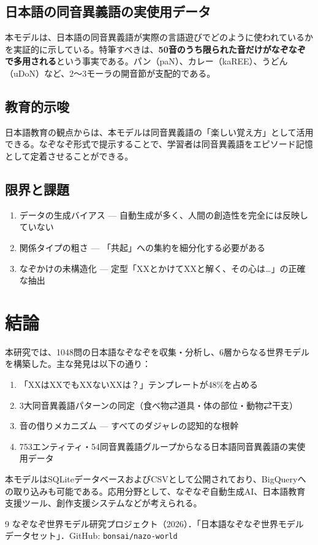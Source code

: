 \documentclass[a4paper,11pt]{ltjsarticle}
\begin{document}
\subsection{日本語の同音異義語の実使用データ}

本モデルは、日本語の同音異義語が実際の言語遊びでどのように使われているかを実証的に示している。特筆すべきは、\textbf{50音のうち限られた音だけがなぞなぞで多用される}という事実である。パン（paN）、カレー（kaREE）、うどん（uDoN）など、2〜3モーラの開音節が支配的である。

\subsection{教育的示唆}

日本語教育の観点からは、本モデルは同音異義語の「楽しい覚え方」として活用できる。なぞなぞ形式で提示することで、学習者は同音異義語をエピソード記憶として定着させることができる。

\subsection{限界と課題}

\begin{enumerate}
    \item データの生成バイアス — 自動生成が多く、人間の創造性を完全には反映していない
    \item 関係タイプの粗さ — 「共起」への集約を細分化する必要がある
    \item なぞかけの未構造化 — 定型「XXとかけてXXと解く、その心は…」の正確な抽出
\end{enumerate}

\section{結論}

本研究では、1048問の日本語なぞなぞを収集・分析し、6層からなる世界モデルを構築した。主な発見は以下の通り：

\begin{enumerate}
    \item 「XXはXXでもXXないXXは？」テンプレートが48\%を占める
    \item 3大同音異義語パターンの同定（食べ物⇄道具・体の部位・動物⇄干支）
    \item 音の借りメカニズム — すべてのダジャレの認知的な根幹
    \item 753エンティティ・54同音異義語グループからなる日本語同音異義語の実使用データ
\end{enumerate}

本モデルはSQLiteデータベースおよびCSVとして公開されており、BigQueryへの取り込みも可能である。応用分野として、なぞなぞ自動生成AI、日本語教育支援ツール、創作支援システムなどが考えられる。

\begin{thebibliography}{9}
 なぞなぞ世界モデル研究プロジェクト（2026）．「日本語なぞなぞ世界モデル データセット」．GitHub: \texttt{bonsai/nazo-world}
\end{thebibliography}
\end{document}
